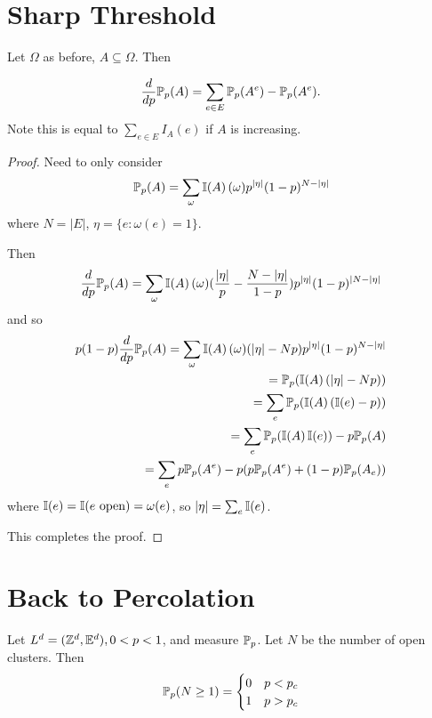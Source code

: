 \section{Sharp Threshold}
\label{sec:sharp-threshold}

Let $\Omega$ as before, $A \subseteq \Omega$.  Then
\begin{thm}
  \label{defn:random_walks_on_graphs:24}
  \begin{align}
    \label{eq:31}
    \frac{d}{dp} \Prob_{p}(A) = \sum_{e \in E} \Prob_{p}(A^{e}) - \Prob_{p}(A^{e}).
  \end{align}
  Note this is equal to $\sum_{e \in E} I_{A}(e)$ if $A$ is increasing.
\end{thm}

\begin{proof}
  Need to only consider
  \begin{align}
    \label{eq:32}
    \Prob_{p}(A) = \sum_{\omega} \I{A}(\omega) p^{|\eta|}(1-p)^{N - |\eta|}
  \end{align} where $N = |E|$, $\eta = \{ e: \omega(e)= 1 \}$.

  Then
  \begin{align}
    \label{eq:33}
    \frac{d}{dp}\Prob_{p}(A) = \sum_{\omega} \I{A}(\omega)
    (\frac{|\eta|}{p} - \frac{N - |\eta|}{1 - p}) p^{|\eta|}(1-p)^{|N
      - |\eta|}
  \end{align}
  and so
  \begin{align}
    \label{eq:34}
    p(1-p) \frac{d}{dp}\Prob_{p}(A) = \sum_{\omega}
    \I{A}(\omega)(|\eta| - Np) p^{|\eta|}(1-p)^{N - |\eta|} \\
    = \Prob_{p}(\I{A}(|\eta| - Np)) \\
    = \sum_{e} \Prob_{p}(\I{A}(\I{e} - p)) \\
    = \sum_{e} \Prob_{p}(\I{A}\I{e}) - p \Prob_{p}(A) \\
    = \sum_{e} p \Prob_{p}(A^{e}) - p(p \Prob_{p}(A^{e}) + (1-p) \Prob_{p}(A_{e}))
  \end{align} where $\I{e} = \I{\text{$e$ open}} = \omega(e)$, so
  $|\eta| = \sum_{e} \I{e}$.

  This completes the proof.
\end{proof}

\section{Back to Percolation}
\label{sec:back-percolation}

Let $L^{d} = (\Z^{d}, \E^{d}), 0 < p < 1$, and measure $\Prob_{p}$.
Let $N$ be the number of open clusters.  Then
\begin{align}
  \Prob_{p}(N \geq 1) =
  \begin{cases}
    0 & p < p_{c} \\
    1 & p > p_{c}
  \end{cases}
\end{align}

